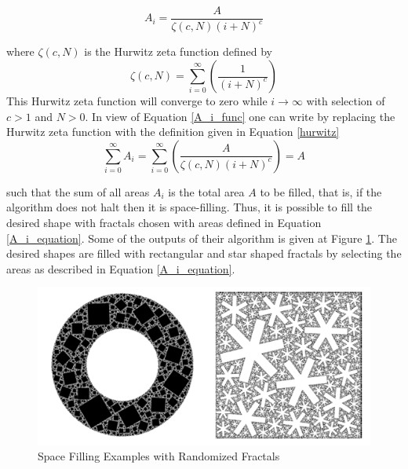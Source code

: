 	\begin{equation} \label{A_i_func}
	A_i = {\frac{A}{{\zeta(c,N)(i+N)^c}}}
	\end{equation}	
	
	where ${\zeta(c,N)}$ is the Hurwitz zeta function defined by 
	\begin{equation} \label{hurwitz}
	\zeta(c,N) = \sum_{i=0}^{\infty}\left(\frac{1}{(i+N)^c}\right)
	\end{equation}
	This Hurwitz zeta function will converge to zero while $i\to\infty$  with selection of $c>1$ and $N>0$. In view of Equation \ref{A_i_func} one can write by replacing the Hurwitz zeta function with the definition given in Equation \ref{hurwitz}
	\begin{equation} \label{A_i_equation}
	\sum_{i=0}^{\infty}A_i = \sum_{i = 0}^{\infty}\left(\frac{A}{\zeta(c,N)(i+N)^c}\right) = A
	\end{equation}


such that the sum of all areas $A_i$ is the total area $A$ to be filled, that is, if the algorithm does not halt then it is space-filling. Thus, it is possible to fill the desired shape with fractals chosen with areas defined in Equation \ref{A_i_equation}. Some of the outputs of their algorithm is given at Figure \ref{space_filling}. The desired shapes are filled with rectangular and star shaped fractals by selecting the areas as described in Equation \ref{A_i_equation}.



\begin{figure}[H]
	\caption{Space Filling Examples with Randomized Fractals \cite{26}} \label{space_filling}
	\centering
	\includegraphics[scale = 0.7]{randomized1}
\end{figure}


